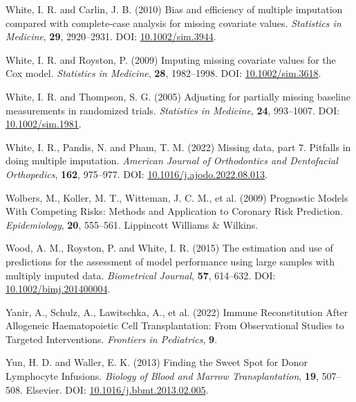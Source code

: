 \documentclass[
  letterpaper,
  DIV=11,
  numbers=noendperiod]{scrreprt}
\newlength{\cslhangindent}
\newlength{\cslentryspacingunit} %
\newenvironment{CSLReferences}[2] %
 {%
  \setlength{\parindent}{0pt}
  \ifodd #1
  \let\oldpar\par
  \def\par{\hangindent=\cslhangindent\oldpar}
  \fi
  \setlength{\parskip}{#2\cslentryspacingunit}
 }%
 {}
\begin{document}
\begin{CSLReferences}{1}{0}
\leavevmode{}%
White, I. R. and Carlin, J. B. (2010) Bias and efficiency of multiple
imputation compared with complete-case analysis for missing covariate
values. \emph{Statistics in Medicine}, \textbf{29}, 2920--2931. DOI:
\href{https://doi.org/10.1002/sim.3944}{10.1002/sim.3944}.

\leavevmode{}%
White, I. R. and Royston, P. (2009) Imputing missing covariate values
for the {Cox} model. \emph{Statistics in Medicine}, \textbf{28},
1982--1998. DOI:
\href{https://doi.org/10.1002/sim.3618}{10.1002/sim.3618}.

\leavevmode{}%
White, I. R. and Thompson, S. G. (2005) Adjusting for partially missing
baseline measurements in randomized trials. \emph{Statistics in
Medicine}, \textbf{24}, 993--1007. DOI:
\href{https://doi.org/10.1002/sim.1981}{10.1002/sim.1981}.

\leavevmode{}%
White, I. R., Pandis, N. and Pham, T. M. (2022) Missing data, part 7.
{Pitfalls} in doing multiple imputation. \emph{American Journal of
Orthodontics and Dentofacial Orthopedics}, \textbf{162}, 975--977. DOI:
\href{https://doi.org/10.1016/j.ajodo.2022.08.013}{10.1016/j.ajodo.2022.08.013}.

\leavevmode{}%
Wolbers, M., Koller, M. T., Witteman, J. C. M., et al. (2009) Prognostic
{Models With Competing Risks}: {Methods} and {Application} to {Coronary
Risk Prediction}. \emph{Epidemiology}, \textbf{20}, 555--561. Lippincott
Williams \& Wilkins.

\leavevmode{}%
Wood, A. M., Royston, P. and White, I. R. (2015) The estimation and use
of predictions for the assessment of model performance using large
samples with multiply imputed data. \emph{Biometrical Journal},
\textbf{57}, 614--632. DOI:
\href{https://doi.org/10.1002/bimj.201400004}{10.1002/bimj.201400004}.

\leavevmode{}%
Yanir, A., Schulz, A., Lawitschka, A., et al. (2022) Immune
{Reconstitution After Allogeneic Haematopoietic Cell Transplantation}:
{From Observational Studies} to {Targeted Interventions}.
\emph{Frontiers in Pediatrics}, \textbf{9}.

\leavevmode{}%
Yun, H. D. and Waller, E. K. (2013) Finding the {Sweet Spot} for {Donor
Lymphocyte Infusions}. \emph{Biology of Blood and Marrow
Transplantation}, \textbf{19}, 507--508. Elsevier. DOI:
\href{https://doi.org/10.1016/j.bbmt.2013.02.005}{10.1016/j.bbmt.2013.02.005}.

\end{CSLReferences}
\end{document}
